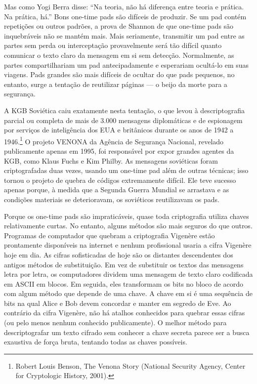 \documentclass{book}
\begin{document}
Mas como Yogi Berra disse: ``Na teoria, não há diferença entre teoria e prática. Na prática, há.'' Bons one-time pads são difíceis de produzir. Se um pad contém repetições ou outros padrões, a prova de Shannon de que one-time pads são inquebráveis não se mantém mais. Mais seriamente, transmitir um pad entre as partes sem perda ou interceptação provavelmente será tão difícil quanto comunicar o texto claro da mensagem em si sem detecção. Normalmente, as partes compartilhariam um pad antecipadamente e esperariam ocultá-lo em suas viagens. Pads grandes são mais difíceis de ocultar do que pads pequenos, no entanto, surge a tentação de reutilizar páginas --- o beijo da morte para a segurança.

A KGB Soviética caiu exatamente nesta tentação, o que levou à descriptografia parcial ou completa de mais de 3.000 mensagens diplomáticas e de espionagem por serviços de inteligência dos EUA e britânicos durante os anos de 1942 a 1946.\footnote{Robert Louis Benson, The Venona Story (National Security Agency, Center for Cryptologic History, 2001).} O projeto VENONA da Agência de Segurança Nacional, revelado publicamente apenas em 1995, foi responsável por expor grandes agentes da KGB, como Klaus Fuchs e Kim Philby. As mensagens soviéticas foram criptografadas duas vezes, usando um one-time pad além de outras técnicas; isso tornou o projeto de quebra de códigos extremamente difícil. Ele teve sucesso apenas porque, à medida que a Segunda Guerra Mundial se arrastava e as condições materiais se deterioravam, os soviéticos reutilizavam os pads.

Porque os one-time pads são impraticáveis, quase toda criptografia utiliza chaves relativamente curtas. No entanto, alguns métodos são mais seguros do que outros. Programas de computador que quebram a criptografia Vigenère estão prontamente disponíveis na internet e nenhum profissional usaria a cifra Vigenère hoje em dia. As cifras sofisticadas de hoje são os distantes descendentes dos antigos métodos de substituição. Em vez de substituir os textos das mensagens letra por letra, os computadores dividem uma mensagem de texto claro codificada em ASCII em blocos. Em seguida, eles transformam os bits no bloco de acordo com algum método que depende de uma chave. A chave em si é uma sequência de bits na qual Alice e Bob devem concordar e manter em segredo de Eve. Ao contrário da cifra Vigenère, não há atalhos conhecidos para quebrar essas cifras (ou pelo menos nenhum conhecido publicamente). O melhor método para descriptografar um texto cifrado sem conhecer a chave secreta parece ser a busca exaustiva de força bruta, tentando todas as chaves possíveis.
\end{document}
